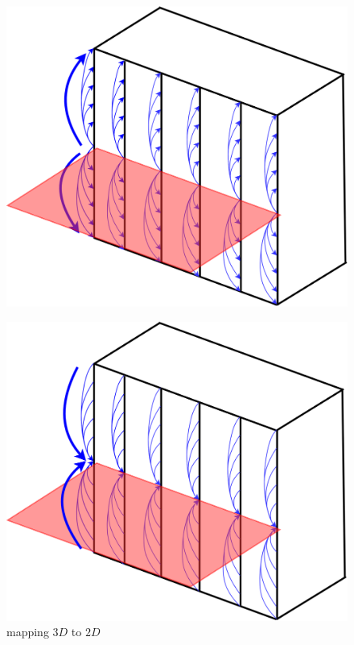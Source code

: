 \begin{frame}

\begin{figure}
\includegraphics[scale=0.5]{./Resources/Images/mapping23.png}%
\end{figure}

\end{frame}


\begin{frame}

\begin{figure}
\includegraphics[scale=0.5]{./Resources/Images/mapping32.png}%
\caption{mapping $3D$ to $2D$}
\end{figure}

\end{frame}


